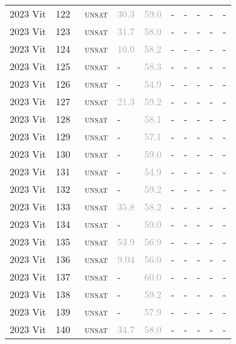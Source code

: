 \begin{center}
{\begin{longtable}{@{}llllllllll@{}}
2023 Vit & 122 & ~\textsc{unsat} & \textcolor{darkgray}{30.3} & \textcolor{darkgray}{59.0} & - & - & - & - & - \\
2023 Vit & 123 & ~\textsc{unsat} & \textcolor{darkgray}{31.7} & \textcolor{darkgray}{58.0} & - & - & - & - & - \\
2023 Vit & 124 & ~\textsc{unsat} & \textcolor{darkgray}{10.0} & \textcolor{darkgray}{58.2} & - & - & - & - & - \\
2023 Vit & 125 & ~\textsc{unsat} & - & \textcolor{darkgray}{58.3} & - & - & - & - & - \\
2023 Vit & 126 & ~\textsc{unsat} & - & \textcolor{darkgray}{54.9} & - & - & - & - & - \\
2023 Vit & 127 & ~\textsc{unsat} & \textcolor{darkgray}{21.3} & \textcolor{darkgray}{59.2} & - & - & - & - & - \\
2023 Vit & 128 & ~\textsc{unsat} & - & \textcolor{darkgray}{58.1} & - & - & - & - & - \\
2023 Vit & 129 & ~\textsc{unsat} & - & \textcolor{darkgray}{57.1} & - & - & - & - & - \\
2023 Vit & 130 & ~\textsc{unsat} & - & \textcolor{darkgray}{59.0} & - & - & - & - & - \\
2023 Vit & 131 & ~\textsc{unsat} & - & \textcolor{darkgray}{54.9} & - & - & - & - & - \\
2023 Vit & 132 & ~\textsc{unsat} & - & \textcolor{darkgray}{59.2} & - & - & - & - & - \\
2023 Vit & 133 & ~\textsc{unsat} & \textcolor{darkgray}{35.8} & \textcolor{darkgray}{58.2} & - & - & - & - & - \\
2023 Vit & 134 & ~\textsc{unsat} & - & \textcolor{darkgray}{59.0} & - & - & - & - & - \\
2023 Vit & 135 & ~\textsc{unsat} & \textcolor{darkgray}{53.9} & \textcolor{darkgray}{56.9} & - & - & - & - & - \\
2023 Vit & 136 & ~\textsc{unsat} & \textcolor{darkgray}{9.04} & \textcolor{darkgray}{56.0} & - & - & - & - & - \\
2023 Vit & 137 & ~\textsc{unsat} & - & \textcolor{darkgray}{60.0} & - & - & - & - & - \\
2023 Vit & 138 & ~\textsc{unsat} & - & \textcolor{darkgray}{59.2} & - & - & - & - & - \\
2023 Vit & 139 & ~\textsc{unsat} & - & \textcolor{darkgray}{57.9} & - & - & - & - & - \\
2023 Vit & 140 & ~\textsc{unsat} & \textcolor{darkgray}{34.7} & \textcolor{darkgray}{58.0} & - & - & - & - & - \\

\end{longtable}}
\end{center}
